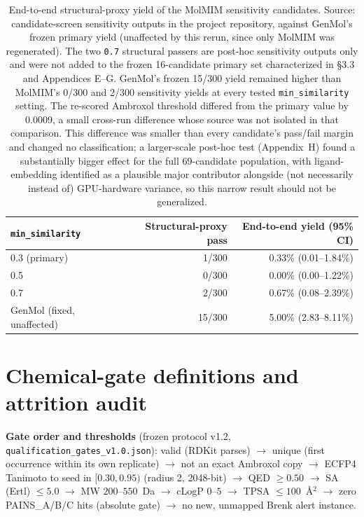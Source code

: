 \documentclass{article}
\begin{document}
\begin{table}[h]
\centering
\footnotesize
\begin{tabular}{lrr}
\toprule
\texttt{min\_similarity} & Structural-proxy pass & End-to-end yield (95\% CI) \\
\midrule
0.3 (primary) & 1/300 & 0.33\% (0.01--1.84\%) \\
0.5 & 0/300 & 0.00\% (0.00--1.22\%) \\
0.7 & 2/300 & 0.67\% (0.08--2.39\%) \\
\midrule
GenMol (fixed, unaffected) & 15/300 & 5.00\% (2.83--8.11\%) \\
\bottomrule
\end{tabular}
\caption{End-to-end structural-proxy yield of the MolMIM sensitivity candidates. Source: candidate-screen sensitivity outputs in the project repository, against GenMol's frozen primary yield (unaffected by this rerun, since only MolMIM was regenerated). The two \texttt{0.7} structural passers are post-hoc sensitivity outputs only and were not added to the frozen 16-candidate primary set characterized in \S3.3 and Appendices E--G. GenMol's frozen 15/300 yield remained higher than MolMIM's 0/300 and 2/300 sensitivity yields at every tested \texttt{min\_similarity} setting. The re-scored Ambroxol threshold differed from the primary value by 0.0009, a small cross-run difference whose source was not isolated in that comparison. This difference was smaller than every candidate's pass/fail margin and changed no classification; a larger-scale post-hoc test (Appendix~H) found a substantially bigger effect for the full 69-candidate population, with ligand-embedding identified as a plausible major contributor alongside (not necessarily instead of) GPU-hardware variance, so this narrow result should not be generalized.}
\end{table}

\FloatBarrier
\section{Chemical-gate definitions and attrition audit}
\label{app:b}

\textbf{Gate order and thresholds} (frozen protocol v1.2, \texttt{qualification\_gates\_v1.0.json}): valid (RDKit parses) $\to$ unique (first occurrence within its own replicate) $\to$ not an exact Ambroxol copy $\to$ ECFP4 Tanimoto to seed in $[0.30,0.95)$ (radius 2, 2048-bit) $\to$ QED $\geq 0.50$ $\to$ SA (Ertl) $\leq 5.0$ $\to$ MW $200$--$550$~Da $\to$ cLogP $0$--$5$ $\to$ TPSA $\leq 100$~\AA$^2$ $\to$ zero PAINS\_A/B/C hits (absolute gate) $\to$ no new, unmapped Brenk alert instance.
\end{document}
